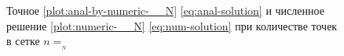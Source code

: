 
\begin{figure}[htb]
  \centering
  \caption{Точное \ref{plot:anal-by-numeric-__N}
    \eqref{eq:anal-solution} и численное решение
    \ref{plot:numeric-__N} \eqref{eq:num-solution} при количестве
    точек в сетке $n=__N$}
  \label{fig:numeric-plot}
\end{figure}
